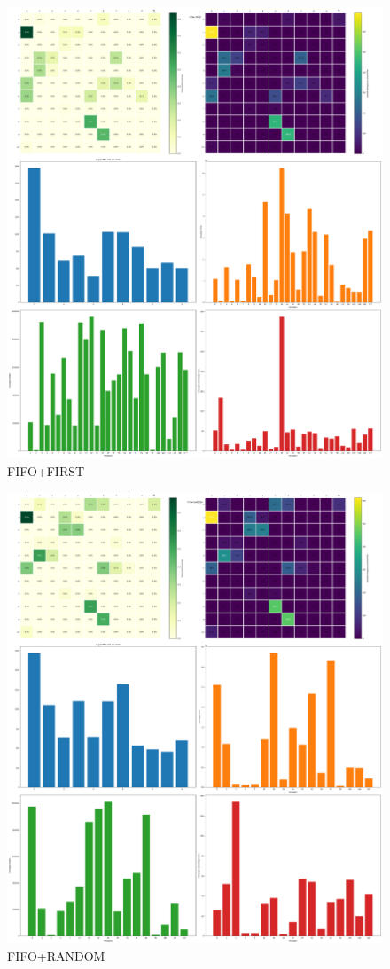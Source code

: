 \documentclass[11pt,a4paper]{article}
\begin{document}
\begin{figure}[H]
\includegraphics[width=\textwidth]{fifo_first.png}
\caption{FIFO+FIRST}
\end{figure}

\begin{figure}[H]
\includegraphics[width=\textwidth]{fifo_random.png}
\caption{FIFO+RANDOM}
\end{figure}
\end{document}

